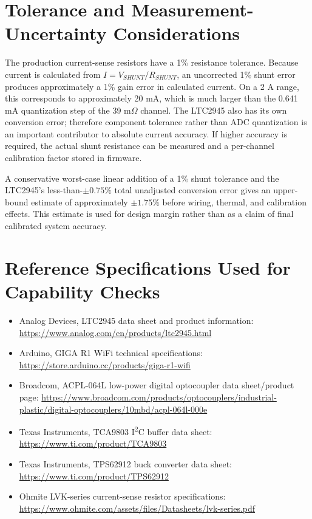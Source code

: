 \section{Tolerance and Measurement-Uncertainty Considerations}
The production current-sense resistors have a 1\% resistance tolerance. Because
current is calculated from \(I=V_{SHUNT}/R_{SHUNT}\), an uncorrected 1\% shunt
error produces approximately a 1\% gain error in calculated current. On a 2 A
range, this corresponds to approximately 20 mA, which is much larger than the
0.641 mA quantization step of the 39 m\(\Omega\) channel. The LTC2945 also has
its own conversion error; therefore component tolerance rather than ADC
quantization is an important contributor to absolute current accuracy. If
higher accuracy is required, the actual shunt resistance can be measured and a
per-channel calibration factor stored in firmware.

A conservative worst-case linear addition of a 1\% shunt tolerance and the
LTC2945's less-than-\(\pm0.75\%\) total unadjusted conversion error gives an
upper-bound estimate of approximately \(\pm1.75\%\) before wiring, thermal, and
calibration effects. This estimate is used for design margin rather than as a
claim of final calibrated system accuracy.

\section{Reference Specifications Used for Capability Checks}
\begin{itemize}
    \item Analog Devices, LTC2945 data sheet and product information: \url{https://www.analog.com/en/products/ltc2945.html}
    \item Arduino, GIGA R1 WiFi technical specifications: \url{https://store.arduino.cc/products/giga-r1-wifi}
    \item Broadcom, ACPL-064L low-power digital optocoupler data sheet/product page: \url{https://www.broadcom.com/products/optocouplers/industrial-plastic/digital-optocouplers/10mbd/acpl-064l-000e}
    \item Texas Instruments, TCA9803 I\textsuperscript{2}C buffer data sheet: \url{https://www.ti.com/product/TCA9803}
    \item Texas Instruments, TPS62912 buck converter data sheet: \url{https://www.ti.com/product/TPS62912}
    \item Ohmite LVK-series current-sense resistor specifications:
    \url{https://www.ohmite.com/assets/files/Datasheets/lvk-series.pdf}
\end{itemize}
